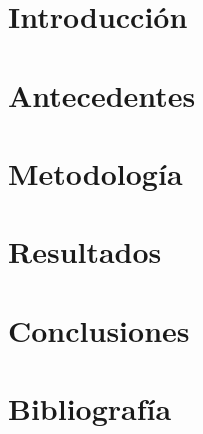 \documentclass[12pt,dvipsnames,a4paper,twoside]{article}
\begin{document}



\newpage
\section{Introducción}




\newpage
\section{Antecedentes}



\newpage
\section{Metodología}




\newpage
\section{Resultados}


\newpage
\section{Conclusiones}


\newpage
\section{Bibliografía}

\begingroup
    \renewcommand{\section}[2]{}%
     
    
\endgroup
\end{document}
